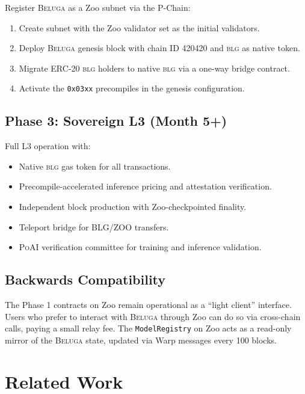 \documentclass[11pt,letterpaper]{article}
\newcommand{\Beluga}{\textsc{Beluga}}
\newcommand{\BLG}{\textsc{blg}}
\newcommand{\PoAI}{\textsc{PoAI}}
\begin{document}
Register \Beluga{} as a Zoo subnet via the P-Chain:

\begin{enumerate}[nosep]
    \item Create subnet with the Zoo validator set as the initial validators.
    \item Deploy \Beluga{} genesis block with chain ID 420420 and \BLG{} as native token.
    \item Migrate ERC-20 \BLG{} holders to native \BLG{} via a one-way bridge contract.
    \item Activate the \texttt{0x03xx} precompiles in the genesis configuration.
\end{enumerate}

\subsection{Phase 3: Sovereign L3 (Month 5+)}

Full L3 operation with:

\begin{itemize}[nosep]
    \item Native \BLG{} gas token for all transactions.
    \item Precompile-accelerated inference pricing and attestation verification.
    \item Independent block production with Zoo-checkpointed finality.
    \item Teleport bridge for BLG/ZOO transfers.
    \item \PoAI{} verification committee for training and inference validation.
\end{itemize}

\subsection{Backwards Compatibility}

The Phase 1 contracts on Zoo remain operational as a ``light client'' interface. Users who prefer to interact with \Beluga{} through Zoo can do so via cross-chain calls, paying a small relay fee. The \texttt{ModelRegistry} on Zoo acts as a read-only mirror of the \Beluga{} state, updated via Warp messages every 100 blocks.

\section{Related Work}\label{sec:related}
\end{document}
